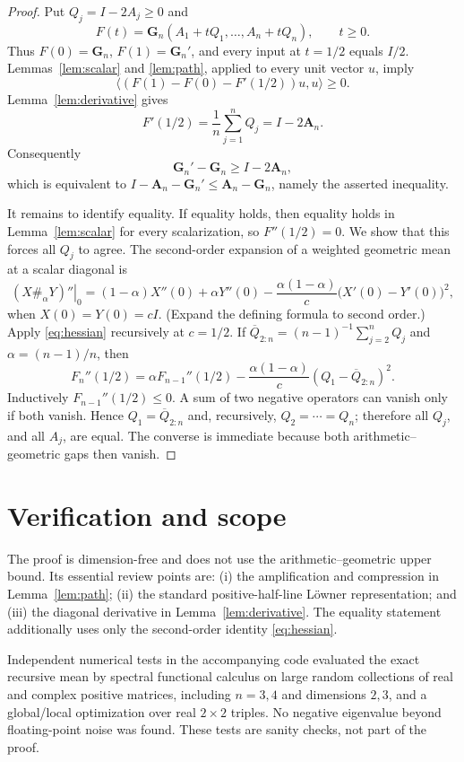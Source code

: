 \documentclass[11pt]{article}
\newcommand{\G}{\mathbf G}
\newcommand{\A}{\mathbf A}
\begin{document}
\begin{proof}
Put $Q_j=I-2A_j\geq0$ and
\[
 F(t)=\G_n(A_1+tQ_1,\ldots,A_n+tQ_n),\qquad t\geq0.
\]
Thus $F(0)=\G_n$, $F(1)=\G_n'$, and every input at $t=1/2$ equals
$I/2$.  Lemmas~\ref{lem:scalar} and \ref{lem:path}, applied to every unit
vector $u$, imply
\[
 \langle(F(1)-F(0)-F'(1/2))u,u\rangle\geq0.
\]
Lemma~\ref{lem:derivative} gives
\[
 F'(1/2)=\frac1n\sum_{j=1}^nQ_j=I-2\A_n.
\]
Consequently
\[
 \G_n'-\G_n\geq I-2\A_n,
\]
which is equivalent to
$I-\A_n-\G_n'\leq\A_n-\G_n$, namely the asserted inequality.

It remains to identify equality.  If equality holds, then equality holds
in Lemma~\ref{lem:scalar} for every scalarization, so
$F''(1/2)=0$.  We show that this forces all $Q_j$ to agree.  The
second-order expansion of a weighted geometric mean at a scalar diagonal is
\begin{equation}\label{eq:hessian}
 \left.(X\#_\alpha Y)''\right|_0
 =(1-\alpha)X''(0)+\alpha Y''(0)
 -\frac{\alpha(1-\alpha)}{c}\bigl(X'(0)-Y'(0)\bigr)^2,
\end{equation}
when $X(0)=Y(0)=cI$.  (Expand the defining formula to second order.)
Apply \eqref{eq:hessian} recursively at $c=1/2$.  If
$\overline Q_{2:n}=(n-1)^{-1}\sum_{j=2}^nQ_j$ and
$\alpha=(n-1)/n$, then
\[
 F_n''(1/2)=\alpha F_{n-1}''(1/2)
 -\frac{\alpha(1-\alpha)}{c}
       (Q_1-\overline Q_{2:n})^2.
\]
Inductively $F_{n-1}''(1/2)\leq0$.  A sum of two negative operators can
vanish only if both vanish.  Hence $Q_1=\overline Q_{2:n}$ and, recursively,
$Q_2=\cdots=Q_n$; therefore all $Q_j$, and all $A_j$, are equal.  The
converse is immediate because both arithmetic--geometric gaps then vanish.
\end{proof}

\section{Verification and scope}

The proof is dimension-free and does not use the arithmetic--geometric
upper bound.  Its essential review points are: (i) the amplification and
compression in Lemma~\ref{lem:path}; (ii) the standard positive-half-line
L\"owner representation; and (iii) the diagonal derivative in
Lemma~\ref{lem:derivative}.  The equality statement additionally uses only
the second-order identity \eqref{eq:hessian}.

Independent numerical tests in the accompanying code evaluated the exact
recursive mean by spectral functional calculus on large random collections
of real and complex positive matrices, including $n=3,4$ and dimensions
$2,3$, and a global/local optimization over real $2\times2$ triples.  No
negative eigenvalue beyond floating-point noise was found.  These tests are
sanity checks, not part of the proof.
\end{document}
